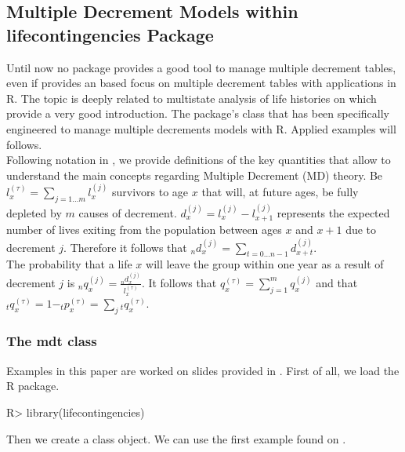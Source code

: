 \documentclass[nojss]{jss}
\begin{document}
\subsection{Multiple Decrement Models within lifecontingencies Package}

Until now no  package provides a good tool to manage multiple decrement tables, even if \cite{deshmukh2012multiple} provides an  based focus on multiple decrement tables with applications in R. The topic is deeply related to multistate analysis of life histories on which \cite{willekens2014multistate} provide a very good introduction. The  package's  class that has been specifically engineered to manage multiple decrements models with R. Applied examples will follows.\\

Following notation in \cite{finanMLC}, we provide definitions of the key quantities that allow to understand the main concepts regarding Multiple Decrement (MD) theory. Be $l_x^{(\tau )} = \sum\limits_{j = 1 \ldots m} {l_x^{(j)}}$ survivors to age $x$ that will, at future ages, be fully depleted by $m$ causes of decrement. $d_{x}^{(j)}=l_{x}^{(j)}-l_{x+1}^{(j)}$ represents the expected number of lives exiting from the population between ages $x$ and $x + 1$ due to decrement $j$. Therefore it follows that $_nd_x^{(j)} = \sum\limits_{t = 0 \ldots n - 1} {d_{x + t}^{(j)}}$.\\
The probability that a life $x$ will leave the group within one year as a result of decrement $j$ is $_nq_x^{(j)} = \frac{{_nd_x^{(j)}}}{{l_x^{(\tau )}}}$. It follows that $q_x^{(\tau )} = \sum\limits_{j = 1}^m {q_x^{(j)}}$ and that $_tq_x^{(\tau )} = 1{ - _t}p_x^{(\tau )} = \sum\limits_j {_tq_x^{(\tau )}}$.


\subsubsection{The mdt class}

Examples in this paper are worked on slides provided in \cite{valdezSlides}.
First of all, we load the R package.

\begin{Schunk}
\begin{Sinput}
R> library(lifecontingencies)
\end{Sinput}
\end{Schunk}

Then  we create a  class object. We can use the first example found on
\cite[p. 4]{valdezSlide}.
\end{document}
